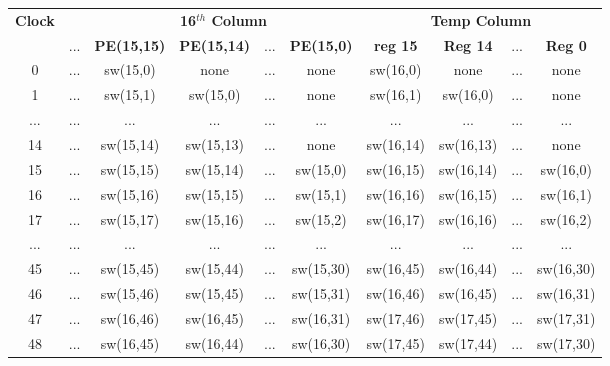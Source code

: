 \begin{table}[htbp]
	\centering
	\label{tab:dataflow2}
	\begin{tabular}{|c|c|c|c|c|c|c|c|c|c|}
		\hline
		\textbf{Clock} &  &  \multicolumn{4}{c|}{\textbf{16$^{th}$ Column}} &  \multicolumn{4}{c|}{\textbf{Temp Column}}  \\
		\cline{3-10}
		& ... & \textbf{PE(15,15)} & \textbf{PE(15,14)} & ... & \textbf{PE(15,0)} & \textbf{reg 15} & \textbf{Reg 14} & ... & \textbf{Reg 0}  \\
		\hline
		0 & ... & sw(15,0) & none & ... & none & sw(16,0) & none & ... & none  \\
		
		1 & ... & sw(15,1) & sw(15,0) & ... & none & sw(16,1) & sw(16,0) & ... & none  \\
		
		... & ... & ... & ... & ... & ... & ... & ... & ... & ... \\
		
		14 & ... & sw(15,14) & sw(15,13) & ... & none & sw(16,14) & sw(16,13) & ... & none \\ 
		
		15 & ... & sw(15,15) & sw(15,14) & ... & sw(15,0) & sw(16,15) & sw(16,14) & ... & sw(16,0)  \\
		
		\hline
		
		16 & ... & sw(15,16) & sw(15,15) & ... & sw(15,1) & sw(16,16) & sw(16,15) & ... & sw(16,1) \\
		
		17 & ... & sw(15,17) & sw(15,16) & ... & sw(15,2) & sw(16,17) & sw(16,16) & ... & sw(16,2) \\
		
		... & ... & ... & ... & ... & ... & ... & ... & ... & ... \\
		
		45 & ... & sw(15,45) & sw(15,44) & ... & sw(15,30) & sw(16,45) & sw(16,44) & ... & sw(16,30) \\
		
		46 & ... & sw(15,46) & sw(15,45) & ... & sw(15,31) & sw(16,46) & sw(16,45) & ... & sw(16,31)  \\
		
		\hline
		
		47 & ... & sw(16,46) & sw(16,45) & ... & sw(16,31) & sw(17,46) & sw(17,45) & ... & sw(17,31) \\
		
		48 & ... & sw(16,45) & sw(16,44) & ... & sw(16,30) & sw(17,45) & sw(17,44) & ... & sw(17,30) \\
		

\end{tabular}
\end{table}
